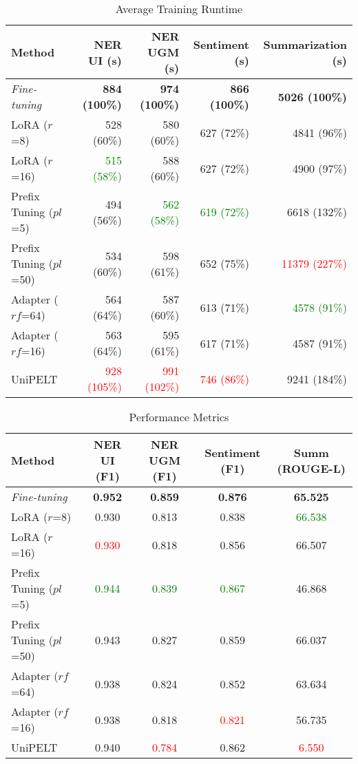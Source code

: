 \begin{table*}[!ht]
    \centering
    \caption{Average Training Runtime}
    \label{table:runtime}
    \begin{tabular}{l|r|r|r|r}
        \toprule
        \textbf{Method} & \textbf{NER UI (s)} & \textbf{NER UGM (s)} & \textbf{Sentiment (s)} & \textbf{Summarization (s)} \\
        \midrule
        \textit{Fine-tuning} & \textbf{884 (100\%)} & \textbf{974 (100\%)} & \textbf{866 (100\%)} & \textbf{5026 (100\%)} \\
        LoRA ($r$=8) & 528 (60\%) & 580 (60\%) & 627 (72\%) & 4841 (96\%) \\
        LoRA ($r$=16) & \textcolor{Green}{515 (58\%)} & 588 (60\%) & 627 (72\%) & 4900 (97\%) \\
        Prefix Tuning ($pl$=5) & 494 (56\%) & \textcolor{Green}{562 (58\%)} & \textcolor{Green}{619 (72\%)} & 6618 (132\%) \\
        Prefix Tuning ($pl$=50) & 534 (60\%) & 598 (61\%) & 652 (75\%) & \textcolor{Red}{11379 (227\%)} \\
        Adapter ($rf$=64) & 564 (64\%) & 587 (60\%) & {613 (71\%)} & \textcolor{Green}{4578 (91\%)} \\
        Adapter ($rf$=16) & 563 (64\%) & 595 (61\%) & 617 (71\%) & 4587 (91\%) \\
        UniPELT & \textcolor{Red}{928 (105\%)} & \textcolor{Red}{991 (102\%)} & \textcolor{Red}{746 (86\%)} & 9241 (184\%) \\
        \bottomrule
    \end{tabular}
\end{table*}

\begin{table*}[!ht]
    \centering
    \caption{Performance Metrics}
    \label{table:performance}
    \begin{tabular}{l|c|c|c|c}
        \toprule
        \textbf{Method} & \textbf{NER UI (F1)} & \textbf{NER UGM (F1)} & \textbf{Sentiment (F1)} & \textbf{Summ (ROUGE-L)} \\
        \midrule
        \textit{Fine-tuning} & \textbf{0.952} & \textbf{0.859} & \textbf{0.876} & \textbf{65.525} \\
        LoRA ($r$=8) & {0.930} & 0.813 & 0.838 & \textcolor{Green}{66.538} \\
        LoRA ($r$=16) & \textcolor{Red}{0.930} & 0.818 & 0.856 & 66.507 \\
        Prefix Tuning ($pl$=5) & \textcolor{Green}{0.944} & \textcolor{Green}{0.839} & \textcolor{Green}{0.867} & 46.868 \\
        Prefix Tuning ($pl$=50) & 0.943 & 0.827 & 0.859 & 66.037 \\
        Adapter ($rf$=64) & 0.938 & 0.824 & 0.852 & 63.634 \\
        Adapter ($rf$=16) & 0.938 & 0.818 & \textcolor{Red}{0.821} & 56.735 \\
        UniPELT & 0.940 & \textcolor{Red}{0.784} & 0.862 & \textcolor{Red}{6.550} \\
        \bottomrule
    \end{tabular}
\end{table*}

